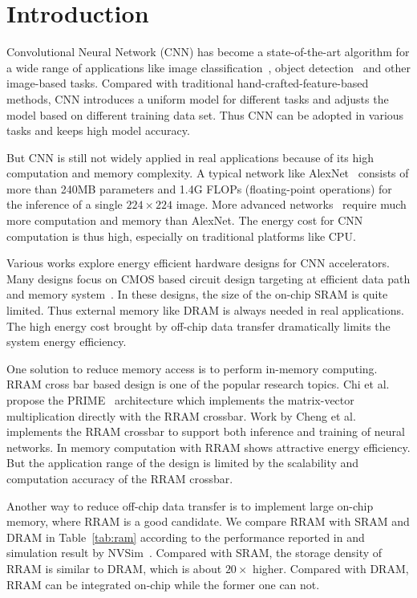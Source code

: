 \section{Introduction}

Convolutional Neural Network (CNN) has become a state-of-the-art algorithm for a wide range of applications like image classification~\cite{simonyan2014very}\cite{he2015deep}, object detection~\cite{redmon2015you} and other image-based tasks. Compared with traditional hand-crafted-feature-based methods, CNN introduces a uniform model for different tasks and adjusts the model based on different training data set. Thus CNN can be adopted in various tasks and keeps high model accuracy.

But CNN is still not widely applied in real applications because of its high computation and memory complexity. A typical network like AlexNet~\cite{krizhevsky2012imagenet} consists of more than 240MB parameters and 1.4G FLOPs (floating-point operations) for the inference of a single $224\times 224$ image. More advanced networks~\cite{simonyan2014very, he2015deep} require much more computation and memory than AlexNet. The energy cost for CNN computation is thus high, especially on traditional platforms like CPU.

Various works explore energy efficient hardware designs for CNN accelerators. Many designs focus on CMOS based circuit design targeting at efficient data path and memory system~\cite{zhang2015optimizing, qiu2016going, du2015shidiannao}. In these designs, the size of the on-chip SRAM is quite limited. Thus external memory like DRAM is always needed in real applications. The high energy cost brought by off-chip data transfer dramatically limits the system energy efficiency.

One solution to reduce memory access is to perform in-memory computing. RRAM cross bar based design is one of the popular research topics. Chi et al. propose the PRIME~\cite{chi2016prime} architecture which implements the matrix-vector multiplication directly with the RRAM crossbar. Work by Cheng et al.~\cite{cheng2017time} implements the RRAM crossbar to support both inference and training of neural networks. In memory computation with RRAM shows attractive energy efficiency. But the application range of the design is limited by the scalability and computation accuracy of the RRAM crossbar.

Another way to reduce off-chip data transfer is to implement large on-chip memory, where RRAM is a good candidate. We compare RRAM with SRAM and DRAM in Table~\ref{tab:ram} according to the performance reported in \cite{ee598, fackenthal201419} and simulation result by NVSim~\cite{dong2014nvsim}. Compared with SRAM, the storage density of RRAM is similar to DRAM, which is about $20\times$ higher. Compared with DRAM, RRAM can be integrated on-chip while the former one can not.

